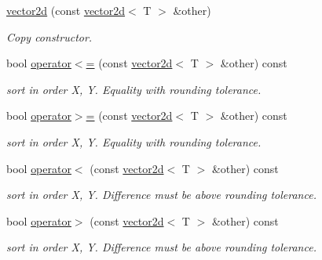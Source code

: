 \begin{DoxyCompactItemize}
\hyperlink{classirr_1_1core_1_1vector2d_a8ebd20ef37425d42120c13aabdf63298}{vector2d} (const \hyperlink{classirr_1_1core_1_1vector2d}{vector2d}$<$ T $>$ \&other)
\begin{DoxyCompactList}\small\item\em Copy constructor. \end{DoxyCompactList}\item 
\mbox{\label{classirr_1_1core_1_1vector2d_ac6489831d99a69de7bcaf11033f39cbb}} 
bool \hyperlink{classirr_1_1core_1_1vector2d_ac6489831d99a69de7bcaf11033f39cbb}{operator$<$=} (const \hyperlink{classirr_1_1core_1_1vector2d}{vector2d}$<$ T $>$ \&other) const
\begin{DoxyCompactList}\small\item\em sort in order X, Y. Equality with rounding tolerance. \end{DoxyCompactList}\item 
\mbox{\label{classirr_1_1core_1_1vector2d_abb2be95a6bcf8f2e9ce22fc10c09dee5}} 
bool \hyperlink{classirr_1_1core_1_1vector2d_abb2be95a6bcf8f2e9ce22fc10c09dee5}{operator$>$=} (const \hyperlink{classirr_1_1core_1_1vector2d}{vector2d}$<$ T $>$ \&other) const
\begin{DoxyCompactList}\small\item\em sort in order X, Y. Equality with rounding tolerance. \end{DoxyCompactList}\item 
\mbox{\label{classirr_1_1core_1_1vector2d_a13fb215fc9d3c6f1f43c07b1a040bd06}} 
bool \hyperlink{classirr_1_1core_1_1vector2d_a13fb215fc9d3c6f1f43c07b1a040bd06}{operator$<$} (const \hyperlink{classirr_1_1core_1_1vector2d}{vector2d}$<$ T $>$ \&other) const
\begin{DoxyCompactList}\small\item\em sort in order X, Y. Difference must be above rounding tolerance. \end{DoxyCompactList}\item 
\mbox{\label{classirr_1_1core_1_1vector2d_a744e5ad34a264a4aa490fc80313ef09f}} 
bool \hyperlink{classirr_1_1core_1_1vector2d_a744e5ad34a264a4aa490fc80313ef09f}{operator$>$} (const \hyperlink{classirr_1_1core_1_1vector2d}{vector2d}$<$ T $>$ \&other) const
\begin{DoxyCompactList}\small\item\em sort in order X, Y. Difference must be above rounding tolerance. \end{DoxyCompactList}\item 

\end{DoxyCompactItemize}
